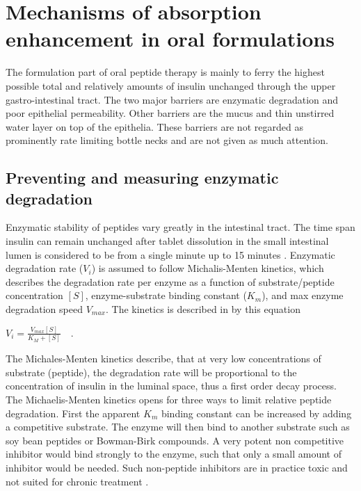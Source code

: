 \section{Mechanisms of absorption enhancement in oral formulations}
The formulation part of oral peptide therapy is mainly to ferry the highest possible total and relatively amounts of insulin unchanged through the upper gastro-intestinal tract. The two major barriers are enzymatic degradation and poor epithelial permeability. Other barriers are the mucus and thin unstirred water layer on top of the epithelia. These barriers are not regarded as prominently rate limiting bottle necks and are not given as much attention.

\subsection{Preventing and measuring enzymatic degradation}
Enzymatic stability of peptides vary greatly in the intestinal tract. The time span insulin can remain unchanged after tablet dissolution in the small intestinal lumen is considered to be from a single minute up to 15 minutes \cite{welling2014citric}. Enzymatic degradation rate ($V_i$) is assumed to follow Michalis-Menten kinetics, which describes the degradation rate per enzyme as a function of substrate/peptide concentration $[S]$, enzyme-substrate binding constant ($K_m$), and max enzyme degradation speed $V_{max}$. The kinetics is described in by this equation

$V_i = \frac{V_{max} [S]}{K_{M}+[S]} \quad .$

The Michales-Menten kinetics describe, that at very low concentrations of substrate (peptide), the degradation rate will be proportional to the concentration of insulin in the luminal space, thus a first order decay process. 
The Michaelis-Menten kinetics opens for three ways to limit relative peptide degradation. First the apparent $K_m$ binding constant can be increased by adding a competitive substrate. The enzyme will then bind to another substrate such as soy bean peptides or Bowman-Birk compounds. A very potent non competitive inhibitor would bind strongly to the enzyme, such that only a small amount of inhibitor would be needed. Such non-peptide inhibitors are in practice toxic and not suited for chronic treatment \cite{bernkop1998use,murthy1980effect}. 

